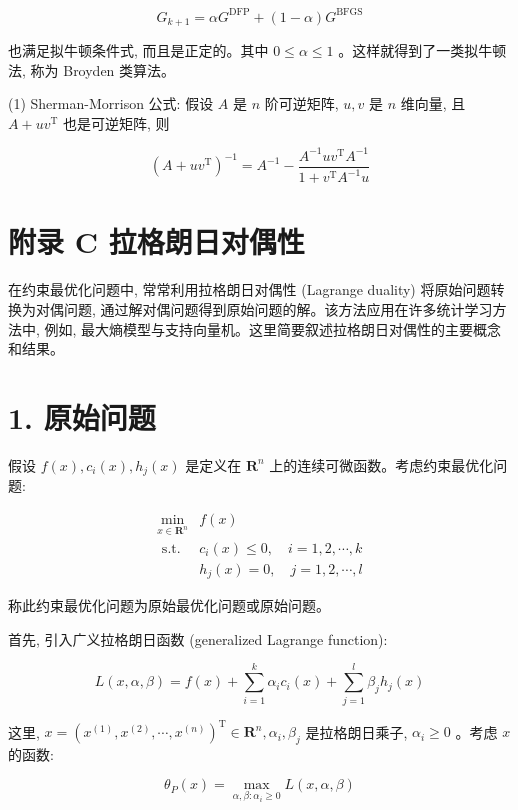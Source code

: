 \documentclass[10pt]{article}
\begin{document}
\begin{equation*}
G_{k+1}=\alpha G^{\mathrm{DFP}}+(1-\alpha) G^{\mathrm{BFGS}} \tag{B.32}
\end{equation*}


也满足拟牛顿条件式, 而且是正定的。其中 $0 \leqslant \alpha \leqslant 1$ 。这样就得到了一类拟牛顿法, 称为 Broyden 类算法。

(1) Sherman-Morrison 公式: 假设 $A$ 是 $n$ 阶可逆矩阵, $u, v$ 是 $n$ 维向量, 且 $A+u v^{\mathrm{T}}$ 也是可逆矩阵, 则

$$
\left(A+u v^{\mathrm{T}}\right)^{-1}=A^{-1}-\frac{A^{-1} u v^{\mathrm{T}} A^{-1}}{1+v^{\mathrm{T}} A^{-1} u}
$$

\section*{附录 C 拉格朗日对偶性}
在约束最优化问题中, 常常利用拉格朗日对偶性 (Lagrange duality) 将原始问题转换为对偶问题, 通过解对偶问题得到原始问题的解。该方法应用在许多统计学习方法中, 例如, 最大熵模型与支持向量机。这里简要叙述拉格朗日对偶性的主要概念和结果。

\section*{1. 原始问题}
假设 $f(x), c_{i}(x), h_{j}(x)$ 是定义在 $\boldsymbol{R}^{n}$ 上的连续可微函数。考虑约束最优化问题:

\[
\begin{array}{ll}
\min _{x \in \boldsymbol{R}^{n}} & f(x) \\
\text { s.t. } & c_{i}(x) \leqslant 0, \quad i=1,2, \cdots, k \\
& h_{j}(x)=0, \quad j=1,2, \cdots, l \tag{C.3}
\end{array}
\]

称此约束最优化问题为原始最优化问题或原始问题。

首先, 引入广义拉格朗日函数 (generalized Lagrange function):


\begin{equation*}
L(x, \alpha, \beta)=f(x)+\sum_{i=1}^{k} \alpha_{i} c_{i}(x)+\sum_{j=1}^{l} \beta_{j} h_{j}(x) \tag{C.4}
\end{equation*}


这里, $x=\left(x^{(1)}, x^{(2)}, \cdots, x^{(n)}\right)^{\mathrm{T}} \in \boldsymbol{R}^{n}, \alpha_{i}, \beta_{j}$ 是拉格朗日乘子, $\alpha_{i} \geqslant 0$ 。考虑 $x$ 的函数:


\begin{equation*}
\theta_{P}(x)=\max _{\alpha, \beta: \alpha_{i} \geqslant 0} L(x, \alpha, \beta) \tag{C.5}
\end{equation*}
\end{document}
